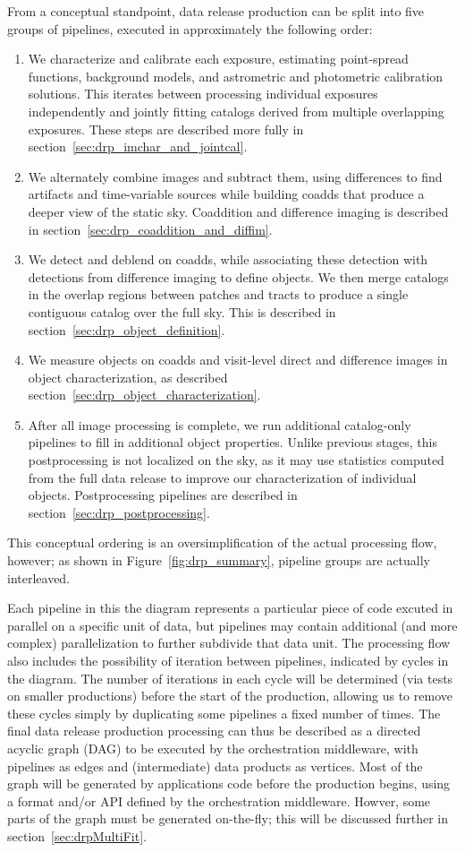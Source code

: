 From a conceptual standpoint, data release production can be split into five groups of pipelines, executed in approximately the following order:
\begin{enumerate}
\item We characterize and calibrate each exposure, estimating point-spread functions, background models, and astrometric and photometric calibration solutions.  This iterates between processing individual exposures independently and jointly fitting catalogs derived from multiple overlapping exposures.  These steps are described more fully in section~\ref{sec:drp_imchar_and_jointcal}.
\item We alternately combine images and subtract them, using differences to find artifacts and time-variable sources while building coadds that produce a deeper view of the static sky.  Coaddition and difference imaging is described in section~\ref{sec:drp_coaddition_and_diffim}.
\item We detect and deblend on coadds, while associating these detection with detections from difference imaging to define objects.  We then merge catalogs in the overlap regions between patches and tracts to produce a single contiguous catalog over the full sky.  This is described in section~\ref{sec:drp_object_definition}.
\item We measure objects on coadds and visit-level direct and difference images in object characterization, as described section~\ref{sec:drp_object_characterization}.
\item After all image processing is complete, we run additional catalog-only pipelines to fill in additional object properties.  Unlike previous stages, this postprocessing is not localized on the sky, as it may use statistics computed from the full data release to improve our characterization of individual objects.  Postprocessing pipelines are described in section~\ref{sec:drp_postprocessing}.
\end{enumerate}
This conceptual ordering is an oversimplification of the actual processing flow, however; as shown in Figure~\ref{fig:drp_summary}, pipeline groups are actually interleaved.

Each pipeline in this the diagram represents a particular piece of code excuted in parallel on a specific unit of data, but pipelines may contain additional (and more complex) parallelization to further subdivide that data unit.  The processing flow also includes the possibility of iteration between pipelines, indicated by cycles in the diagram.  The number of iterations in each cycle will be determined (via tests on smaller productions) before the start of the production, allowing us to remove these cycles simply by duplicating some pipelines a fixed number of times.  The final data release production processing can thus be described as a directed acyclic graph (DAG) to be executed by the orchestration middleware, with pipelines as edges and (intermediate) data products as vertices.  Most of the graph will be generated by applications code before the production begins, using a format and/or API defined by the orchestration middleware.  Howver, some parts of the graph must be generated on-the-fly; this will be discussed further in section~\ref{sec:drpMultiFit}.


